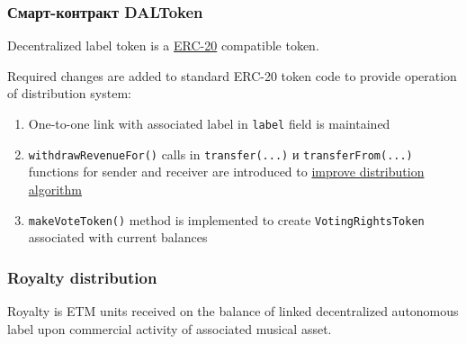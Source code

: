 \documentclass[12pt]{report}
\def\code#1{\colorbox{light-gray}{\texttt{#1}}}
\begin{document}
\subsubsection{Смарт-контракт DALToken}
\label{tech-apps-dal-token}
Decentralized label token is a \hyperref[tech-blockchain-contracts]{ERC-20} compatible token.

Required changes are added to standard ERC-20 token code to provide operation of distribution system:
\begin{enumerate}
	\item One-to-one link with associated label in \code{label} field is maintained
	\item \code{withdrawRevenueFor()} calls in \code{transfer(...)} и \code{transferFrom(...)} functions for sender and receiver are introduced to \hyperref[tech-apps-dal-royalty-optimization]{improve distribution algorithm}
	\item \code{makeVoteToken()} method is implemented to create \code{VotingRightsToken} associated with current balances
\end{enumerate}
\subsubsection{Royalty distribution}
\label{tech-apps-dal-royalty}
Royalty is ETM units received on the balance of linked decentralized autonomous label upon commercial activity of associated musical asset.
\end{document}
